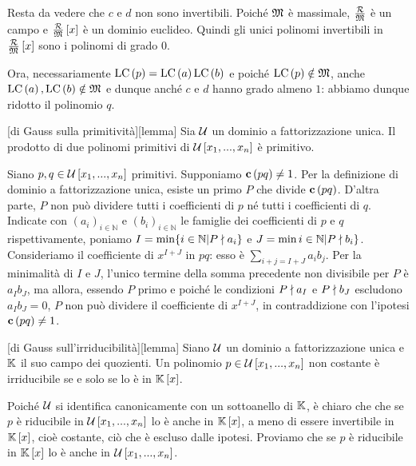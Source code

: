 \par Resta da vedere che $c$ e $d$ non sono invertibili. Poich\'e $\mathfrak{M}$ \`e massimale, $\frac{\mathcal{R}}{\mathfrak{M}}$ \`e un campo e $\frac{\mathcal{R}}{\mathfrak{M}} \left [ x \right ]$ \`e un dominio euclideo. Quindi gli unici polinomi invertibili in $\frac{\mathcal{R}}{\mathfrak{M}} \left [ x \right ]$ sono i polinomi di grado $0$.
\par Ora, necessariamente $\text{LC} \left ( p \right ) = \text{LC} \left ( a \right ) \text{LC} \left ( b \right )$ e poich\'e $\text{LC} \left ( p \right ) \notin \mathfrak{M}$, anche $\text{LC} \left ( a \right ), \text{LC} \left ( b \right ) \notin \mathfrak{M}$ e dunque anch\'e $c$ e $d$ hanno grado almeno $1$: abbiamo dunque ridotto il polinomio $q$. \EndProof
\begin{Theorem}
	[di Gauss sulla primitivit\`a][lemma] Sia $\mathcal{U}$ un dominio a fattorizzazione unica. Il prodotto di due polinomi primitivi di $\mathcal{U} \left [ x_1, ..., x_n \right ]$ \`e primitivo.
\end{Theorem}
\Proof Siano $p, q \in \mathcal{U} \left [ x_1, ..., x_n \right ]$ primitivi. Supponiamo $\mathbf{c}\left ( pq \right ) \neq 1$. Per la definizione di dominio a fattorizzazione unica, esiste un primo $P$ che divide $\mathbf{c}\left ( pq \right )$. D'altra parte, $P$ non pu\`o dividere tutti i coefficienti di $p$ n\'e tutti i coefficienti di $q$. Indicate con $(a_i)_{i \in \mathbb{N}}$ e $(b_i)_{i \in \mathbb{N}}$ le famiglie dei coefficienti di $p$ e $q$ rispettivamente, poniamo $I = \min \lbrace i \in \mathbb{N} | P \nmid a_i \rbrace$ e $J = \min i \in \mathbb{N} | P \nmid b_i \rbrace$. Consideriamo il coefficiente di $x^{I + J}$ in $pq$: esso \`e $\sum_{i + j = I + J} a_ib_j$. Per la minimalit\`a di $I$ e $J$, l'unico termine della somma precedente non divisibile per $P$ \`e $a_Ib_J$, ma allora, essendo $P$ primo e poich\'e le condizioni $P \nmid a_I$ e $P \nmid b_J$ escludono $a_Ib_J = 0$, $P$ non pu\`o dividere il coefficiente di $x^{I + J}$, in contraddizione con l'ipotesi $\mathbf{c}\left ( pq \right ) \neq 1$. \EndProof
\begin{Theorem}
	[di Gauss sull'irriducibilit\`a][lemma] Siano $\mathcal{U}$ un dominio a fattorizzazione unica e $\mathbb{K}$ il suo campo dei quozienti. Un polinomio $p \in \mathcal{U} \left [ x_1, ..., x_n \right ]$ non costante \`e irriducibile se e solo se lo \`e in $\mathbb{K} \left [ x \right ]$.
\end{Theorem}
\Proof Poich\'e $\mathcal{U}$ si identifica canonicamente con un sottoanello di $\mathbb{K}$, \`e chiaro che che se $p$ \`e riducibile in $\mathcal{U} \left [ x_1, ..., x_n \right ]$ lo \`e anche in $\mathbb{K} \left [ x \right ]$, a meno di essere invertibile in $\mathbb{K} \left [ x \right ]$, cio\`e costante, ci\`o che \`e escluso dalle ipotesi. Proviamo che se $p$ \`e riducibile in $\mathbb{K} \left [ x \right ]$ lo \`e anche in $\mathcal{U} \left [ x_1, ..., x_n \right ]$.
